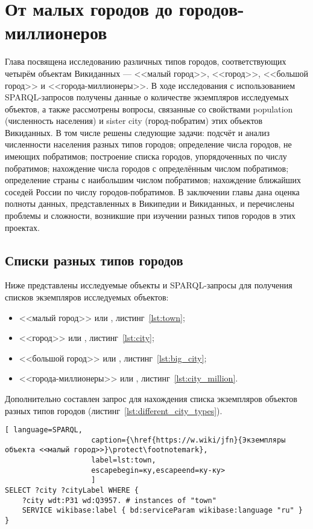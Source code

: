 \chapter{От малых городов до городов-миллионеров}
\label{ch:city}

Глава посвящена исследованию различных типов городов, соответствующих четырём объектам Викиданных — <<малый город>>, <<город>>, <<большой город>> и <<города-миллионеры>>. В ходе исследования с использованием SPARQL-запросов получены данные о количестве экземпляров исследуемых объектов, а также рассмотрены вопросы, связанные со свойствами population (численность населения) и sister city (город-побратим) этих объектов Викиданных. В том числе решены следующие задачи: подсчёт и анализ численности населения разных типов городов; определение числа городов, не имеющих побратимов; построение списка городов, упорядоченных по числу побратимов; нахождение числа городов с определённым числом побратимов; определение страны с наибольшим числом побратимов; нахождение ближайших соседей России по числу городов-побратимов. В заключении главы дана оценка полноты данных, представленных в Википедии и Викиданных, и перечислены проблемы и сложности, возникшие при изучении разных типов городов в этих проектах.
\section{Списки разных типов городов}

Ниже представлены исследуемые объекты и SPARQL-запросы для получения списков экземпляров исследуемых объектов: 
\begin{itemize}
	\item <<малый город>> или , листинг~\ref{lst:town};
	\item <<город>> или , листинг~\ref{lst:city};
	\item <<большой город>> или , листинг~\ref{lst:big_city};
	\item <<города-миллионеры>> или , листинг~\ref{lst:city_million}.
\end{itemize}

Дополнительно составлен запрос для нахождения списка экземпляров объектов разных типов городов (листинг~\ref{lst:different_city_types}).

\begin{lstlisting}[ language=SPARQL, 
                    caption={\href{https://w.wiki/jfn}{Экземпляры объекта <<малый город>>}\protect\footnotemark},
                    label=lst:town, 
                    escapebegin=ку,escapeend=ку-ку>
                    ]
SELECT ?city ?cityLabel WHERE {
	?city wdt:P31 wd:Q3957. # instances of "town"
	SERVICE wikibase:label { bd:serviceParam wikibase:language "ru" }
}
\end{lstlisting}

